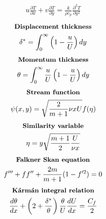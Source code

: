\documentclass[10pt, a4paper]{article}
\newcommand{\derivative}[2]{\frac{\partial #1}{\partial #2}}
\begin{document}
\begin{multicols*}{2}
\begin{gather*}
        u\derivative{ T}{x} + v \derivative{ T}{y} =
        \frac{k}{\rho c_p} \derivative{^2 T}{y^2}
    \end{gather*}
    \begin{gather*}
        \textbf{\small Displacement thickness} \\
        \delta^* = \int_0^\infty\left( 1 - \frac{u}{U} \right)dy
    \end{gather*}
    \begin{gather*}
        \textbf{\small Momentum thickness} \\
        \theta = \int_0^\infty \frac{u}{U}\left( 1 - \frac{u}{U} \right)dy
    \end{gather*}
    \begin{gather*}
        \textbf{\small Stream function} \\
        \psi(x,y) = \sqrt{\frac{2}{m+1}\nu x U}f(\eta)
    \end{gather*}
    \begin{gather*}
        \textbf{\small Similarity variable} \\
        \eta = y \sqrt{\frac{m+1}{2}\frac{U}{\nu x}}
    \end{gather*}
    \begin{gather*}
        \textbf{\small Falkner Skan equation} \\
        f''' + ff'' + \frac{2m}{m+1}(1-f'^2)=0
    \end{gather*}
    \begin{gather*}
        \textbf{\small Kármán integral relation} \\
        \frac{d\theta}{dx} + \left( 2 + \frac{\delta^*}{\theta} \right)\frac{\theta}{U}\frac{dU}{dx} =
        \frac{C_f}{2}
    \end{gather*}
\end{multicols*}
\end{document}
